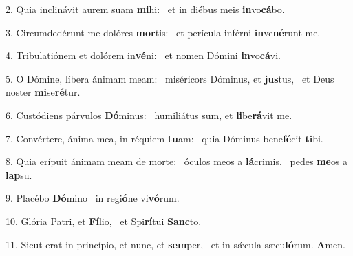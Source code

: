 2. Quia inclinávit aurem suam \textbf{mi}hi: \ast\  et in diébus meis \textbf{in}vo\textbf{cá}bo.\

3. Circumdedérunt me dolóres \textbf{mor}tis: \ast\  et perícula inférni \textbf{in}ve\textbf{né}runt me.\

4. Tribulatiónem et dolórem in\textbf{vé}ni: \ast\  et nomen Dómini \textbf{in}vo\textbf{cá}vi.\

5. O Dómine, líbera ánimam meam: \dag\  miséricors Dóminus, et \textbf{jus}tus, \ast\  et Deus noster \textbf{mi}se\textbf{ré}tur.\

6. Custódiens párvulos \textbf{Dó}minus: \ast\  humiliátus sum, et \textbf{li}be\textbf{rá}vit me.\

7. Convértere, ánima mea, in réquiem \textbf{tu}am: \ast\  quia Dóminus bene\textbf{fé}cit \textbf{ti}bi.\

8. Quia erípuit ánimam meam de morte: \dag\  óculos meos a \textbf{lá}crimis, \ast\  pedes \textbf{me}os a \textbf{lap}su.\

9. Placébo \textbf{Dó}mino \ast\  in regi\textbf{ó}ne vi\textbf{vó}rum.\

10. Glória Patri, et \textbf{Fí}lio, \ast\  et Spi\textbf{rí}tui \textbf{Sanc}to.\

11. Sicut erat in princípio, et nunc, et \textbf{sem}per, \ast\  et in sǽcula sæcu\textbf{ló}rum. \textbf{A}men.\

